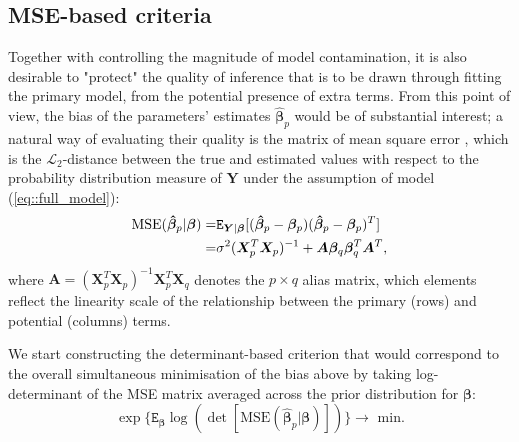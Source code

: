 \subsection{MSE-based criteria}
Together with controlling the magnitude of model contamination, it is also desirable to "protect" the quality of inference that is to be drawn through fitting the primary model, from the potential presence of extra terms. 
From this point of view, the bias of the parameters' estimates $\hat{\bm{\beta}}_p$ would be of substantial interest; a natural way of evaluating their quality is the matrix of  mean square error \citep{FedorovMontepiedra1997}, which is the $\mathcal{L}_2$-distance between the true and estimated values with respect to the probability distribution measure of $\bm{Y}$ under the assumption of model (\ref{eq::full_model}):
\begin{align}
\label{eq::MSE}
\mbox{MSE}(\bm{\hat{\beta}}_p|\bm{\beta})=&\mathtt{E}_{\bm{Y}|\bm{\beta}}[(\bm{\hat{\beta}}_p-\bm{\beta}_p)(\bm{\hat{\beta}}_p-\bm{\beta}_p)^T]\notag\\=&\sigma^2(\bm{X}_p^T\bm{X}_p)^{-1}+\bm{A}\bm{\beta}_q\bm{\beta}_q^T\bm{A}^T, 
\end{align}
where $\bm{A}=(\bm{X}_p^{T}\bm{X}_p)^{-1}\bm{X}_p^{T}\bm{X}_q$ denotes the $p \times q$ alias matrix, which elements reflect the linearity scale of the relationship between the primary (rows) and potential (columns) terms. 

We start constructing the determinant-based criterion that would correspond to the overall simultaneous minimisation of the bias above by taking log-determinant of the MSE matrix averaged across the prior distribution for $\bm{\beta}$:
\begin{equation}
\label{eq::MSE_det}
\exp\{\mathtt{E}_{\bm{\beta}}\log(\det[\mbox{MSE}(\bm{\hat{\beta}}_p|\bm{\beta})])\} \longrightarrow \mbox{ min.}
\end{equation}

